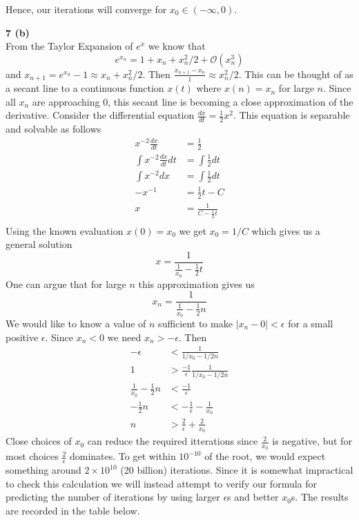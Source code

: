 \documentclass[12pt]{article}
\newcommand{\problem}[1]{\hspace{-4 ex} \large \textbf{#1}\\}
\begin{document}
	Hence, our iterations will converge for $x_0 \in (-\infty,0)$.
	
\problem{7 (b)}
	From the Taylor Expansion of $e^x$ we know that 
	$$e^{x_n} =  1 + x_n + x_n^2/2 + \mathcal{O}(x_n^3)$$
	and $x_{n+1} = e^{x_n}-1 \approx x_n + x_n^2/2$. Then $\frac{x_{n+1} - x_n}{1} \approx x_n^2/2$. This can be thought of as a secant line to a continuous function $x(t)$ where $x(n) = x_n$ for large $n$. Since all $x_n$ are approaching $0$, this secant line is becoming a close approximation of the derivative. Consider the differential equation $\frac{dx}{dt} = \frac{1}{2}x^2$. This equation is separable and solvable as follows
	\begin{align*}
		x^{-2}\frac{dx}{dt} & = \frac{1}{2} \\
		\int x^{-2}\frac{dx}{dt} dt & = \int \frac{1}{2} dt \\
		\int x^{-2}dx & = \int \frac{1}{2} dt \\
		-x^{-1} & = \frac{1}{2}t - C \\
		x & = \frac{1}{C - \frac{1}{2}t} \\
	\end{align*}
	Using the known evaluation $x(0)=x_0$ we get $x_0=1/C$ which gives us a general solution
	$$
	x = \frac{1}{\frac{1}{x_0} - \frac{1}{2}t}
	$$
	One can argue that for large $n$ this approximation gives us 
	$$x_n = \frac{1}{\frac{1}{x_0} - \frac{1}{2}n}$$
	We would like to know a value of $n$ sufficient to make $\vert x_n-0\vert < \epsilon$ for a small positive $\epsilon$. Since $x_n<0$ we need $x_n>-\epsilon$. Then
	\begin{align*}
		-\epsilon &< \frac{1}{1/x_0 - 1/2n} \\
		1 & > \frac{-1}{\epsilon} \frac{1}{1/x_0 - 1/2n} \\
		\frac{1}{x_0} - \frac{1}{2}n & < \frac{-1}{\epsilon}\\
		- \frac{1}{2}n & < -\frac{1}{\epsilon} - \frac{1}{x_0}\\
		n & > \frac{2}{\epsilon} + \frac{2}{x_0}
	\end{align*}
	Close choices of $x_0$ can reduce the required itterations since $\frac{2}{x_0}$ is negative, but for most choices  $\frac{2}{\epsilon}$ dominates. To get within $10^{-10}$ of the root, we would expect something around $2 \times 10^{10}$ (20 billion) iterations. Since it is somewhat impractical to check this calculation we will instead attempt to verify our formula for predicting the number of iterations by using larger $\epsilon$s and better $x_0$s. The results are recorded in the table below.
	
\end{document}
